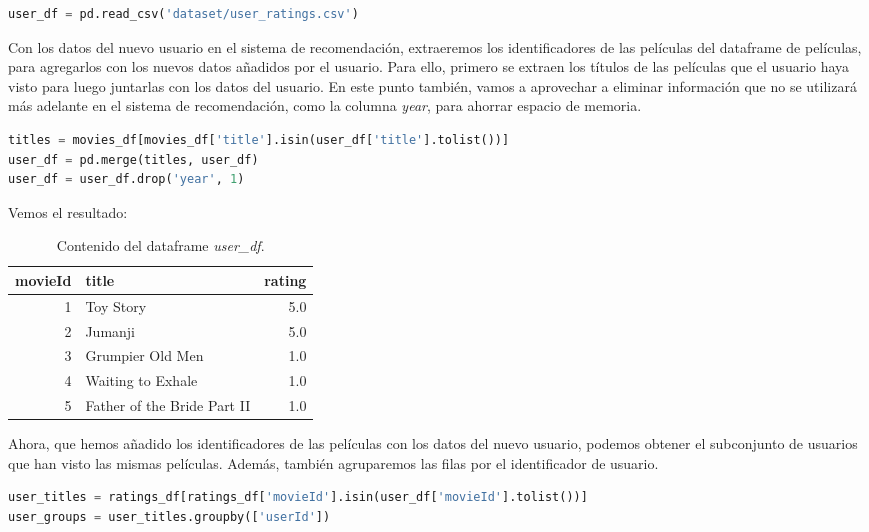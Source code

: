\documentclass{uimppracticas}
\begin{document}
\begin{lstlisting}[language=python]
user_df = pd.read_csv('dataset/user_ratings.csv')
\end{lstlisting}

Con los datos del nuevo usuario en el sistema de recomendación, extraeremos los identificadores de las películas del dataframe de películas, para agregarlos con los nuevos datos añadidos por el usuario. Para ello, primero se extraen los títulos de las películas que el usuario haya visto para luego juntarlas con los datos del usuario. En este punto también, vamos a aprovechar a eliminar información que no se utilizará más adelante en el sistema de recomendación, como la columna \textit{year}, para ahorrar espacio de memoria.

\begin{lstlisting}[language=python]
titles = movies_df[movies_df['title'].isin(user_df['title'].tolist())]
user_df = pd.merge(titles, user_df)
user_df = user_df.drop('year', 1)
\end{lstlisting}

\newpage

Vemos el resultado:

\begin{table}[h]
	\centering
	\begin{tabular}{rlr}
		\toprule
		movieId &                        title &  rating \\
		\midrule
		1 &                    Toy Story &     5.0 \\
		2 &                      Jumanji &     5.0 \\
		3 &             Grumpier Old Men &     1.0 \\
		4 &            Waiting to Exhale &     1.0 \\
		5 &  Father of the Bride Part II &     1.0 \\
		\bottomrule
	\end{tabular}
	\caption{Contenido del dataframe \textit{user\_df}.}
	\label{user_df}
\end{table}

Ahora, que hemos añadido los identificadores de las películas con los datos del nuevo usuario, podemos obtener el subconjunto de usuarios que han visto las mismas películas. Además, también agruparemos las filas por el identificador de usuario.

\begin{lstlisting}[language=python]
user_titles = ratings_df[ratings_df['movieId'].isin(user_df['movieId'].tolist())]
user_groups = user_titles.groupby(['userId'])
\end{lstlisting}
\end{document}
